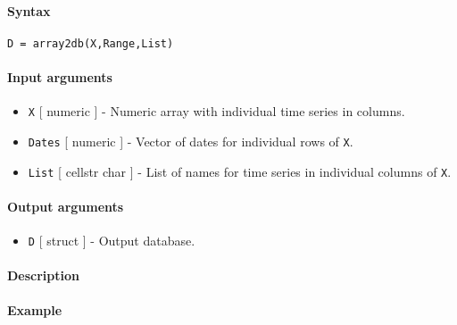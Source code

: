 


	\paragraph{Syntax}

\begin{verbatim}
D = array2db(X,Range,List)
\end{verbatim}

\paragraph{Input arguments}

\begin{itemize}
\item
  \texttt{X} {[} numeric {]} - Numeric array with individual time series
  in columns.
\item
  \texttt{Dates} {[} numeric {]} - Vector of dates for individual rows
  of \texttt{X}.
\item
  \texttt{List} {[} cellstr \textbar{} char {]} - List of names for time
  series in individual columns of \texttt{X}.
\end{itemize}

\paragraph{Output arguments}

\begin{itemize}
\itemsep1pt\parskip0pt
\item
  \texttt{D} {[} struct {]} - Output database.
\end{itemize}

\paragraph{Description}

\paragraph{Example}



